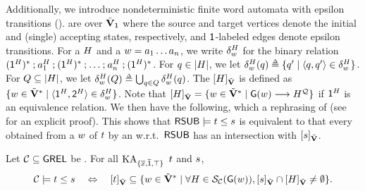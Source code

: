 Additionally, we introduce nondeterministic finite word automata with epsilon transitions (\intro*{}).
 are  over $\tilde{\mathbf{V}}_{\mathsf{1}}$ where the source and target vertices denote the initial and (single) accepting states, respectively, and $\mathsf{1}$-labeled edges denote epsilon transitions.
For a  $\graph[2]$ and a  $\word = a_1 \dots a_n$, we write $\delta_{\word}^{\graph[2]}$ for the binary relation $(\id^{\graph[2]})^* \rcompo a_1^{\graph[2]} \rcompo (\id^{\graph[2]})^* \rcompo \ldots \rcompo a_n^{\graph[2]} \rcompo (\id^{\graph[2]})^*$.
For $q \in \univ{\graph[2]}$, we let $\delta_{\word}^{\graph[2]}(q) \defeq \set{q' \mid \tuple{q, q'} \in \delta_{\word}^{\graph[2]}}$.
For $Q \subseteq \univ{\graph[2]}$, we let $\delta_{\word}^{\graph[2]}(Q) \defeq \bigcup_{q \in Q} \delta_{\word}^{\graph[2]}(q)$.
The  $\ljump{\graph[2]}_{\tilde{\vsig}}$ is defined as $\set{\word \in \tilde{\vsig}^* \mid \tuple{\src^{\graph[2]}, \tgt^{\graph[2]}} \in \delta_{\word}^{\graph[2]}}$.
Note that $\ljump{\graph[2]}_{\tilde{\vsig}} = \set{\word \in \tilde{\vsig}^* \mid \const{\graph}(\word) \homo \graph[2]^{\FillQ}}$ if $\id^{\graph[2]}$ is an equivalence relation.
We then have the following, which a rephrasing of  (see  for an explicit proof).
This shows that $\RSUB \models \term[1] \le \term[2]$ is equivalent to that every  obtained from a  $\word$ of $\term$ by an  w.r.t.\ $\mathsf{RSUB}$ has an intersection with $\ljump{\term[2]}_{\tilde{\vsig}}$.
\begin{corollary}\label{corollary: graph characterization}
    Let $\algclass \subseteq \GREL$ be .
    For all $\mathrm{KA}_{\{\overline{x}, \overline{\mathsf{1}}, \top\}}$  $\term[1]$ and $\term[2]$,
    \[\algclass \models \term[1] \le \term[2] \quad\Leftrightarrow\quad \ljump{\term[1]}_{\tilde{\vsig}} \subseteq \set{\word \in \tilde{\vsig}^* \mid  \forall \graph[2] \in \FillS_{\algclass}(\const{\graph}(\word)), \ljump{\term[2]}_{\tilde{\vsig}} \cap \ljump{\graph[2]}_{\tilde{\vsig}} \neq \emptyset}.\]
\end{corollary}
